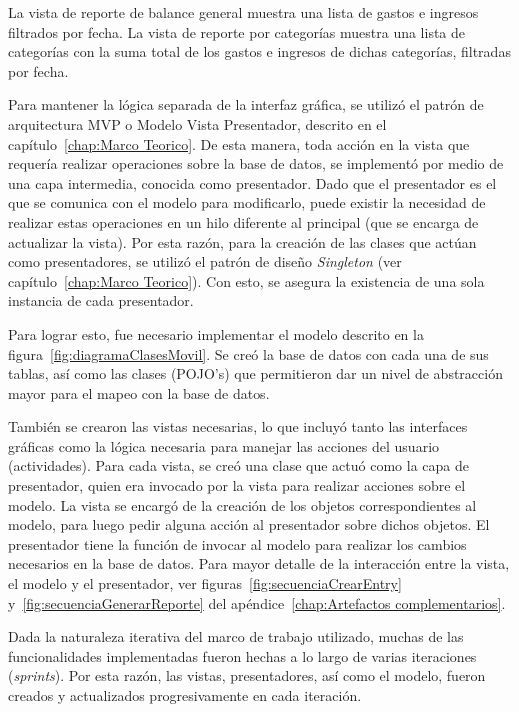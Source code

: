 La vista de reporte de balance general muestra una lista de gastos e ingresos filtrados por fecha. La vista de reporte por categorías muestra una lista de categorías con la suma total de los gastos e ingresos de dichas categorías, filtradas por fecha.

Para mantener la lógica separada de la interfaz gráfica, se utilizó el patrón de arquitectura MVP o Modelo Vista Presentador, descrito en el capítulo~\ref{chap:Marco Teorico}. De esta manera, toda acción en la vista que requería realizar operaciones sobre la base de datos, se implementó por medio de una capa intermedia, conocida como presentador. Dado que el presentador es el que se comunica con el modelo para modificarlo, puede existir la necesidad de realizar estas operaciones en un hilo diferente al principal (que se encarga de actualizar la vista). Por esta razón, para la creación de las clases que actúan como presentadores, se utilizó el patrón de diseño \textit{Singleton} (ver capítulo~\ref{chap:Marco Teorico}). Con esto, se asegura la existencia de una sola instancia de cada presentador. 

Para lograr esto, fue necesario implementar el modelo descrito en la figura~\ref{fig:diagramaClasesMovil}. Se creó la base de datos con cada una de sus tablas, así como las clases (POJO's) que permitieron dar un nivel de abstracción mayor para el mapeo con la base de datos.

También se crearon las vistas necesarias, lo que incluyó tanto las interfaces gráficas como la lógica necesaria para manejar las acciones del usuario (actividades). Para cada vista, se creó una clase que actuó como la capa de presentador, quien era invocado por la vista para realizar acciones sobre el modelo. La vista se encargó de la creación de los objetos correspondientes al modelo, para luego pedir alguna acción al presentador sobre dichos objetos. El presentador tiene la función de invocar al modelo para realizar los cambios necesarios en la base de datos. Para mayor detalle de la interacción entre la vista, el modelo y el presentador, ver figuras~\ref{fig:secuenciaCrearEntry} y~\ref{fig:secuenciaGenerarReporte} del apéndice~\ref{chap:Artefactos complementarios}.

Dada la naturaleza iterativa del marco de trabajo utilizado, muchas de las funcionalidades implementadas fueron hechas a lo largo de varias iteraciones (\textit{sprints}). Por esta razón, las vistas, presentadores, así como el modelo, fueron creados y actualizados progresivamente en cada iteración.

